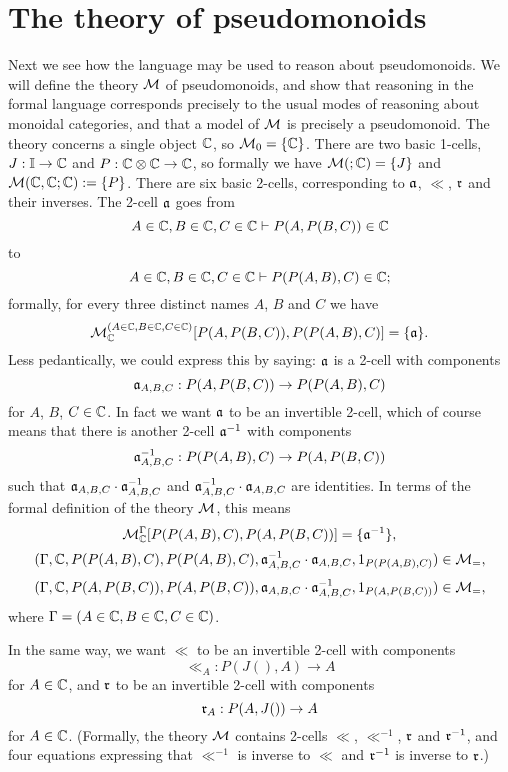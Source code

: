 \documentclass{robinthesisdraft}
\begin{document}
\section{The theory of pseudomonoids}
Next we see how the language may be used to reason about pseudomonoids.
We will define the theory $\M$ of pseudomonoids, and show that reasoning
in the formal language corresponds precisely to the usual modes of reasoning
about monoidal categories, and that a model of $\M$ is precisely a pseudomonoid.
The theory concerns
a single object $\C$, so $\M_{0} = \{\C\}$. There are two basic 1-cells,
$J:\I\to\C$ and $P:\C\tn\C\to\C$, so formally we have $\M(;\C) = \{J\}$
and $\M(\C,\C;\C):=\{P\}$. There are six basic 2-cells, corresponding to
$\aa$, $\ll$, $\rr$ and their inverses. The 2-cell $\aa$ goes from
\[
	A\in\C, B\in\C, C\in\C \proves P(A,P(B,C))\in\C
\]
to
\[
	A\in\C, B\in\C, C\in\C \proves P(P(A,B),C)\in\C;
\]
formally, for every three distinct names $A$, $B$ and $C$ we have
\[\M^{(A\in\C,B\in\C,C\in\C)}_{\C}[P(A,P(B,C)),P(P(A,B),C)] = \{\aa\}.\]
Less pedantically, we could
express this by saying: $\aa$ is a 2-cell with components
\[
	\aa_{A,B,C}: P(A,P(B,C)) \to P(P(A,B),C)
\]
for $A$, $B$, $C\in\C$.
In fact we want $\aa$ to be an invertible 2-cell, which of course
means that there is another 2-cell $\aa^{-1}$ with components
\[
	\aa^{-1}_{A,B,C}: P(P(A,B),C) \to P(A,P(B,C))
\]
such that $\aa_{A,B,C}\cdot\aa^{-1}_{A,B,C}$ and
$\aa^{-1}_{A,B,C}\cdot\aa_{A,B,C}$ are identities.
In terms of the formal definition of the theory $\M$, this means
\[\M^\Gamma_{\C}[P(P(A,B),C),P(A,P(B,C))] = \{\aa^{-1}\},\]
\[(\Gamma,\C,P(P(A,B),C),P(P(A,B),C),\aa^{-1}_{A,B,C}\cdot\aa_{A,B,C},
1_{P(P(A,B),C)})\in\M_{=},\]
\[(\Gamma,\C,P(A,P(B,C)),P(A,P(B,C)),\aa_{A,B,C}\cdot\aa^{-1}_{A,B,C},
1_{P(A,P(B,C))})\in\M_{=},\]
where $\Gamma=(A\in\C,B\in\C,C\in\C)$.

In the same way, we want $\ll$ to be an invertible 2-cell with
components
\[
	\ll_{A}: P(J(),A) \to A
\]
for $A\in\C$, and $\rr$ to be an invertible 2-cell with
components
\[
	\rr_{A}: P(A,J()) \to A
\]
for $A\in\C$. (Formally, the theory $\M$ contains 2-cells $\ll$,
$\ll^{-1}$, $\rr$ and $\rr^{-1}$, and four equations expressing
that $\ll^{-1}$ is inverse to $\ll$ and $\rr^{-1}$ is inverse to $\rr$.)
\end{document}
